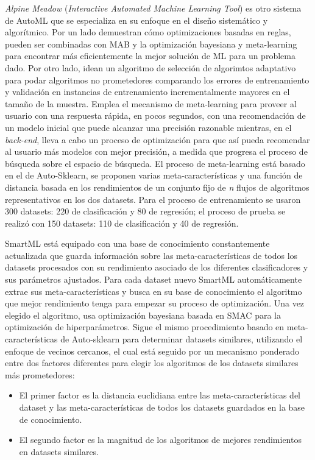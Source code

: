 \textit{Alpine Meadow} (\textit{Interactive Automated Machine Learning Tool}) \cite{shang2019democratizing} es otro sistema de AutoML que se especializa en su enfoque en el diseño sistemático y algorítmico. Por un lado demuestran cómo optimizaciones basadas en reglas, pueden ser combinadas con MAB y la optimización bayesiana y meta-learning para encontrar más eficientemente la mejor solución de ML para un problema dado. Por otro lado, idean un algoritmo de selección de algorimtos adaptativo para podar algoritmos no prometedores comparando los errores de entrenamiento y validación en instancias de entrenamiento incrementalmente mayores en el tamaño de la muestra. Emplea el mecanismo de meta-learning para proveer al usuario con una respuesta rápida, en pocos segundos, con una recomendación de un modelo inicial que puede alcanzar una precisión razonable mientras, en el \textit{back-end}, lleva a cabo un proceso de optimización para que así pueda recomendar al usuario más modelos con mejor precisión, a medida que progresa el proceso de búsqueda sobre el espacio de búsqueda. El proceso de meta-learning está basado en el de Auto-Sklearn, se proponen varias meta-características y una función de distancia basada en los rendimientos de un conjunto fijo de \textit{n} flujos de algoritmos representativos en los dos datasets. Para el proceso de entrenamiento se usaron 300 datasets: 220 de clasificación y 80 de regresión; el proceso de prueba se realizó con 150 datasets: 110 de clasificación y 40 de regresión.

SmartML \cite{maher2019smartml} está equipado con una base de conocimiento constantemente actualizada que guarda información sobre las meta-características de todos los datasets procesados con su rendimiento asociado de los diferentes clasificadores y sus parámetros ajustados. Para cada dataset nuevo SmartML automáticamente extrae sus meta-características y busca en su base de conocimiento el algoritmo que mejor rendimiento tenga para empezar su proceso de optimización. Una vez elegido el algoritmo, usa optimización bayesiana basada en SMAC para la optimización de hiperparámetros. Sigue el mismo procedimiento basado en meta-características de Auto-sklearn para determinar datasets similares, utilizando el enfoque de vecinos cercanos, el cual está seguido por un mecanismo ponderado entre dos factores diferentes para elegir los algoritmos de los datasets similares más prometedores:

\begin{itemize}
	\item El primer factor es la distancia euclidiana entre las meta-características del dataset y las meta-características de todos los datasets guardados en la base de conocimiento.
	\item El segundo factor es la magnitud de los algoritmos de mejores rendimientos en datasets similares.
\end{itemize}

